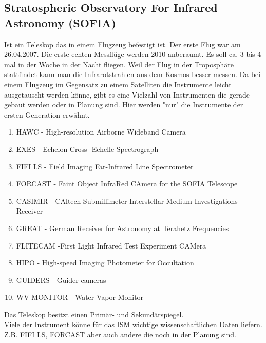 \subsection{Stratospheric Observatory For Infrared Astronomy (SOFIA)}
Ist ein Teleskop das in einem Flugzeug befestigt ist. Der erste Flug war am 26.04.2007. Die erste echten Messflüge werden 2010 anberaumt. Es soll ca. 3 bis 4 mal in der Woche in der Nacht fliegen. Weil der Flug in der Troposphäre stattfindet kann man die Infrarotstrahlen aus dem Kosmos besser messen. Da bei einem Flugzeug im Gegensatz zu einem Satelliten die Instrumente leicht ausgetauscht werden könne, gibt es eine Vielzahl von Instrumenten die gerade gebaut werden oder in Planung sind. Hier werden "nur" die Instrumente der ersten Generation erwähnt. 
\begin{enumerate}
	\item HAWC - High-resolution Airborne Wideband Camera
	\item EXES - Echelon-Cross -Echelle Spectrograph
	\item FIFI LS - Field Imaging Far-Infrared Line Spectrometer
	\item FORCAST - Faint Object InfraRed CAmera for the SOFIA Telescope
	\item CASIMIR - CAltech Submillimeter Interstellar Medium Investigations Receiver
	\item GREAT - German Receiver for Astronomy at Terahetz Frequencies
	\item FLITECAM -First Light Infrared Test Experiment CAMera
	\item HIPO - High-speed Imaging Photometer for Occultation
	\item GUIDERS - Guider cameras
	\item WV MONITOR - Water Vapor Monitor
\end{enumerate}
Das Teleskop besitzt einen Primär- und Sekundärspiegel.\\
Viele der Instrument könne  für das ISM wichtige wissenschaftlichen Daten liefern. Z.B. FIFI LS, FORCAST aber auch andere die noch in der Planung sind. 
